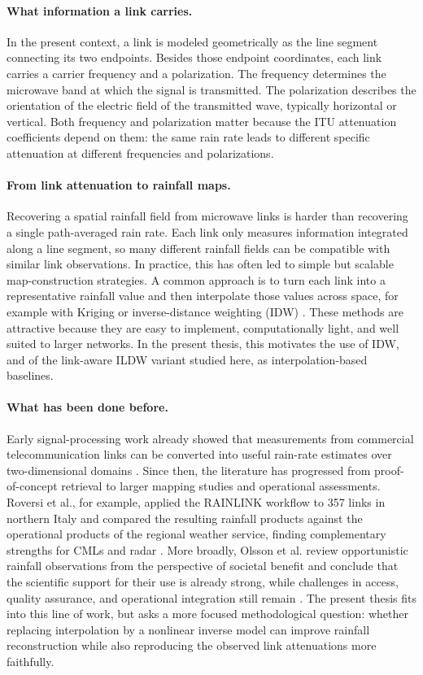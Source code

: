 \documentclass[11pt]{article}
\begin{document}
\paragraph*{What information a link carries.} In the present context, a link is modeled geometrically as the line segment connecting its two endpoints. Besides those endpoint coordinates, each link carries a carrier frequency and a polarization. The frequency determines the microwave band at which the signal is transmitted. The polarization describes the orientation of the electric field of the transmitted wave, typically horizontal or vertical. Both frequency and polarization matter because the ITU attenuation coefficients depend on them: the same rain rate leads to different specific attenuation at different frequencies and polarizations.

\paragraph*{From link attenuation to rainfall maps.} Recovering a spatial rainfall field from microwave links is harder than recovering a single path-averaged rain rate. Each link only measures information integrated along a line segment, so many different rainfall fields can be compatible with similar link observations. In practice, this has often led to simple but scalable map-construction strategies. A common approach is to turn each link into a representative rainfall value and then interpolate those values across space, for example with Kriging or inverse-distance weighting (IDW) \citep{chwala2019cml,olsson2025societal}. These methods are attractive because they are easy to implement, computationally light, and well suited to larger networks. In the present thesis, this motivates the use of IDW, and of the link-aware ILDW variant studied here, as interpolation-based baselines.

\paragraph*{What has been done before.} Early signal-processing work already showed that measurements from commercial telecommunication links can be converted into useful rain-rate estimates over two-dimensional domains \citep{goldshtein2009rain}. Since then, the literature has progressed from proof-of-concept retrieval to larger mapping studies and operational assessments. Roversi et al., for example, applied the RAINLINK workflow to 357 links in northern Italy and compared the resulting rainfall products against the operational products of the regional weather service, finding complementary strengths for CMLs and radar \citep{roversi2020northernitaly}. More broadly, Olsson et al. review opportunistic rainfall observations from the perspective of societal benefit and conclude that the scientific support for their use is already strong, while challenges in access, quality assurance, and operational integration still remain \citep{olsson2025societal}. The present thesis fits into this line of work, but asks a more focused methodological question: whether replacing interpolation by a nonlinear inverse model can improve rainfall reconstruction while also reproducing the observed link attenuations more faithfully.
\end{document}
